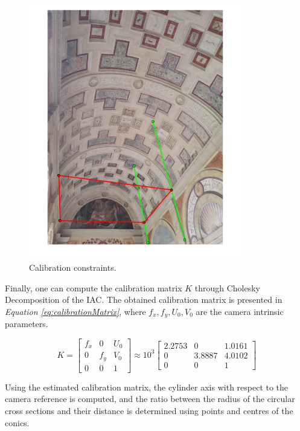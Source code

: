 \documentclass[12pt,a4paper]{article}
\begin{document}
\begin{figure}[H]
    \centering
    \includegraphics[width=0.83\textwidth]{Images/PalazzoTe_IAC_constraints.png}
    \caption[Calibration constraints.]{Calibration constraints.}
    \label{fig:calibConstraints}
\end{figure}

Finally, one can compute the calibration matrix $K$ through Cholesky Decomposition of the IAC. The obtained calibration matrix is presented in \textit{Equation \ref{eq:calibrationMatrix}}, where $f_x,f_y,U_0,V_0$ are the camera intrinsic parameters.

\begin{equation}
    K =
    \begin{bmatrix}
    f_x & 0 & U_0\\
    0 & f_y & V_0\\
    0 & 0 & 1
    \end{bmatrix}
    \approx 10^3
    \begin{bmatrix}
    2.2753 & 0 & 1.0161\\
    0 & 3.8887 & 4.0102\\
    0 & 0 & 1
    \end{bmatrix}
    \label{eq:calibrationMatrix}
\end{equation}
\bigskip

Using the estimated calibration matrix, the cylinder axis with respect to the camera reference is computed, and the ratio between the radius of the circular cross sections and their distance is determined using points and centres of the conics.
\end{document}
